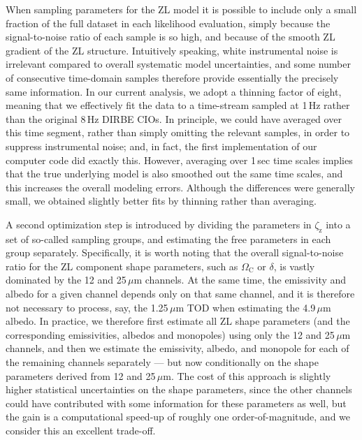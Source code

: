 \documentclass[twocolumn]{aa}
\begin{document}
When sampling parameters for the ZL model it is possible to include only a
small fraction of the full dataset in each likelihood evaluation,
simply because the signal-to-noise ratio of each sample is so high,
and because of the smooth ZL gradient of the ZL
structure. Intuitively speaking, white instrumental noise is
irrelevant compared to overall systematic model uncertainties, and
some number of consecutive time-domain samples therefore provide
essentially the precisely same information. In our current analysis,
we adopt a thinning factor of eight, meaning that we effectively fit
the data to a time-stream sampled at 1\,Hz rather than the original
8\,Hz DIRBE CIOs. In principle, we could have averaged over this time
segment, rather than simply omitting the relevant samples, in order to
suppress instrumental noise; and, in fact, the first implementation of
our computer code did exactly this. However, averaging over 1\,sec
time scales implies that the true underlying model is also smoothed
out the same time scales, and this increases the overall modeling
errors. Although the differences were generally small, we obtained
slightly better fits by thinning rather than averaging.


A second optimization step is introduced by dividing the parameters in
$\zeta_{\mathrm{z}}$ into a set of so-called sampling groups, and
estimating the free parameters in each group separately. Specifically,
it is worth noting that the overall signal-to-noise ratio for the ZL
component shape parameters, such as $\Omega_{\mathrm{C}}$ or $\delta$,
is vastly dominated by the 12 and 25\,$\mu$m channels. At the same
time, the emissivity and albedo for a given channel depends only on that
same channel, and it is therefore not necessary to process, say, the
1.25\,$\mu$m TOD when estimating the 4.9\,$\mu$m albedo. In practice,
we therefore first estimate all ZL shape parameters (and the
corresponding emissivities, albedos and monopoles) using only the 12
and 25\,$\mu$m channels, and then we estimate the emissivity, albedo,
and monopole for each of the remaining channels separately --- but now
conditionally on the shape parameters derived from 12 and
25\,$\mu$m. The cost of this approach is slightly higher statistical
uncertainties on the shape parameters, since the other channels could
have contributed with some information for these parameters as well,
but the gain is a computational speed-up of roughly one
order-of-magnitude, and we consider this an excellent trade-off.
\end{document}
